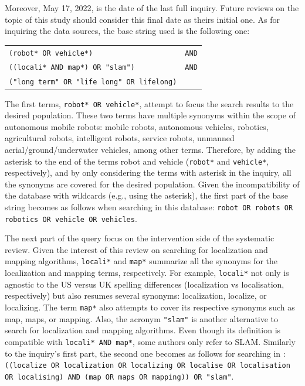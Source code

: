 Moreover, May 17, 2022, is the date of the last full inquiry. Future reviews on the topic of this study should consider this final date as theirs initial one. As for inquiring the data sources, the base string used is the following one:

\vspace{1em}

\noindent\begin{center}
\begin{tabular}{l l}
\texttt{(robot* OR vehicle*)}                     & \texttt{AND}\\
\texttt{((locali* AND map*) OR "slam")}           & \texttt{AND}\\
\texttt{("long term" OR "life long" OR lifelong)}\\
\end{tabular}
\end{center}

\vspace{1em}

The first terms, \texttt{robot* OR vehicle*}, attempt to focus the search results to the desired population. These two terms have multiple synonyms within the scope of autonomous mobile robots: mobile robots, autonomous vehicles, robotics, agricultural robots, intelligent robots, service robots, unmanned aerial/ground/underwater vehicles, among other terms. Therefore, by adding the asterisk to the end of the terms robot and vehicle (\texttt{robot*} and \texttt{vehicle*}, respectively), and by only considering the terms with asterisk in the inquiry, all the synonyms are covered for the desired population. Given the incompatibility of the  database with wildcards (e.g., using the asterisk), the first part of the base string becomes as follows when searching in this database: \texttt{robot OR robots OR robotics OR vehicle OR vehicles}.

The next part of the query focus on the intervention side of the systematic review. Given the interest of this review on searching for localization and mapping algorithms, \texttt{locali*} and \texttt{map*} summarize all the synonyms for the localization and mapping terms, respectively. For example, \texttt{locali*} not only is agnostic to the US versus UK spelling differences (localization vs localisation, respectively) but also resumes several synonyms: localization, localize, or localizing. The term \texttt{map*} also attempts to cover its respective synonyms such as map, maps, or mapping.
Also, the acronym \texttt{"slam"} is another alternative to search for localization and mapping algorithms. Even though its definition is compatible with \texttt{locali* AND map*}, some authors only refer to SLAM.
Similarly to the inquiry's first part, the second one becomes as follows for searching in : \texttt{((localize OR localization OR localizing OR localise OR localisation OR localising) AND (map OR maps OR mapping)) OR "slam"}.

